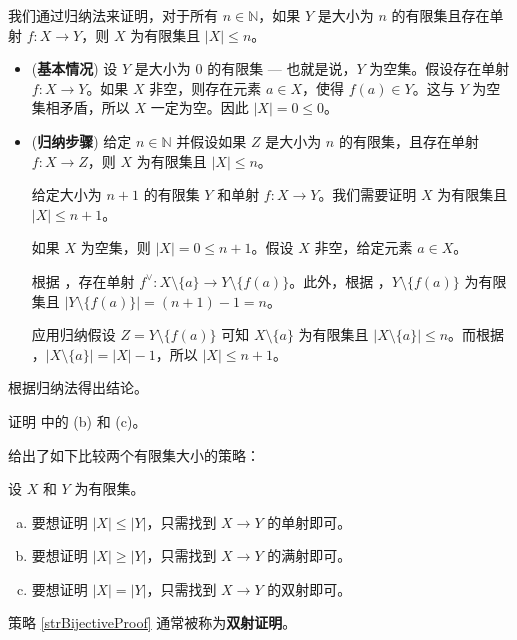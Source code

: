 \begin{cproof}[of (a)]
\item 我们通过归纳法来证明，对于所有 $n \in \mathbb{N}$，如果 $Y$ 是大小为 $n$ 的有限集且存在单射 $f : X \to Y$，则 $X$ 为有限集且 $|X| \le n$。

\begin{itemize}
\item (\textbf{基本情况}) 设 $Y$ 是大小为 $0$ 的有限集 --- 也就是说，$Y$ 为空集。假设存在单射 $f : X \to Y$。如果 $X$ 非空，则存在元素 $a \in X$，使得 $f(a) \in Y$。这与 $Y$ 为空集相矛盾，所以 $X$ 一定为空。因此 $|X| = 0 \le 0$。

\item (\textbf{归纳步骤}) 给定 $n \in \mathbb{N}$ 并假设如果 $Z$ 是大小为 $n$ 的有限集，且存在单射 $f : X \to Z$，则 $X$ 为有限集且 $|X| \le n$。

给定大小为 $n+1$ 的有限集 $Y$ 和单射 $f : X \to Y$。我们需要证明 $X$ 为有限集且 $|X| \le n+1$。

如果 $X$ 为空集，则 $|X| = 0 \le n+1$。假设 $X$ 非空，给定元素 $a \in X$。

根据 ，存在单射 $f^{\vee} : X \setminus \{ a \} \to Y \setminus \{ f(a) \}$。此外，根据 ，$Y \setminus \{ f(a) \}$ 为有限集且 $|Y \setminus \{ f(a) \}| = (n+1) - 1 = n$。

应用归纳假设 $Z = Y \setminus \{ f(a) \}$ 可知 $X \setminus \{ a \}$ 为有限集且 $|X \setminus \{ a \}| \le n$。而根据 ，$|X \setminus \{ a \}| = |X| - 1$，所以 $|X| \le n+1$。
\end{itemize}

根据归纳法得出结论。
\end{cproof}

\begin{exercise}
证明  中的 (b) 和 (c)。
\end{exercise}

 给出了如下比较两个有限集大小的策略：
\begin{strategy}[比较有限集大小]
\label{strComparingSizesOfFiniteSets}
设 $X$ 和 $Y$ 为有限集。
\begin{enumerate}[(a)]
\item 要想证明 $|X| \le |Y|$，只需找到 $X \to Y$ 的单射即可。
\item 要想证明 $|X| \ge |Y|$，只需找到 $X \to Y$ 的满射即可。
\item \label{strBijectiveProof} 要想证明 $|X| = |Y|$，只需找到 $X \to Y$ 的双射即可。
\end{enumerate}
策略 \ref{strBijectiveProof} 通常被称为\textbf{双射证明}。
\end{strategy}

